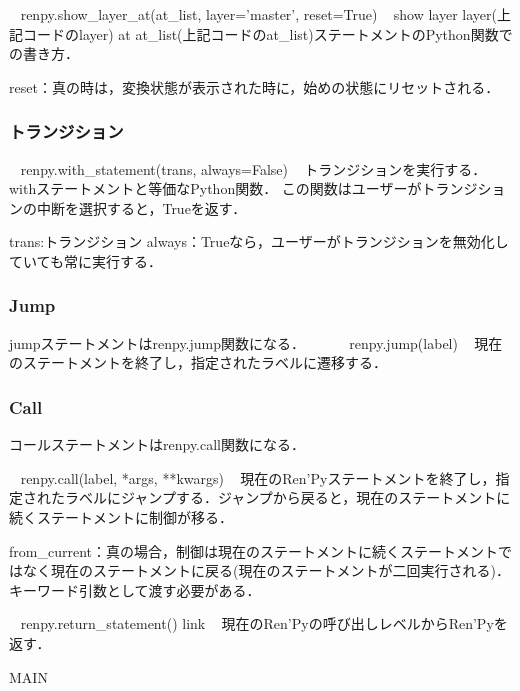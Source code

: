 \documentclass[a4paper]{jarticle}
\begin{document}
    ~
    renpy.show_layer_at(at_list, layer='master', reset=True) 
    ~
    show layer layer(上記コードのlayer) at at_list(上記コードのat_list)ステートメントのPython関数での書き方．

    reset：真の時は，変換状態が表示された時に，始めの状態にリセットされる．

  \subsubsection{トランジション}
   ~
   renpy.with_statement(trans, always=False)
   ~
   トランジションを実行する．withステートメントと等価なPython関数．
   この関数はユーザーがトランジションの中断を選択すると，Trueを返す．

   trans:トランジション
   always：Trueなら，ユーザーがトランジションを無効化していても常に実行する．

  \subsubsection{Jump}
    jumpステートメントはrenpy.jump関数になる．
　　~
    renpy.jump(label)
    ~
    現在のステートメントを終了し，指定されたラベルに遷移する．
    
  \subsubsection{Call}
    コールステートメントはrenpy.call関数になる．

    ~
    renpy.call(label, *args, **kwargs) 
    ~
    現在のRen'Pyステートメントを終了し，指定されたラベルにジャンプする．ジャンプから戻ると，現在のステートメントに続くステートメントに制御が移る．

    from_current：真の場合，制御は現在のステートメントに続くステートメントではなく現在のステートメントに戻る(現在のステートメントが二回実行される)．キーワード引数として渡す必要がある．

    ~
    renpy.return_statement() link
    ~
    現在のRen'Pyの呼び出しレベルからRen'Pyを返す．



\expandafter\ifx\csname MAIN \endcsname\relax
  
\end{document}
